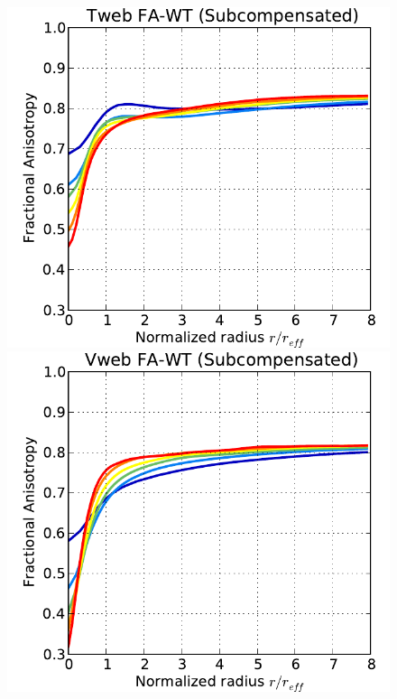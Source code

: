 \documentclass[a4,useAMS,usenatbib,usegraphicx]{mn2e}
\begin{document}
\begin{figure}
\centering  
  \includegraphics[trim = 1mm 0mm 5mm 0mm, clip, keepaspectratio=true,
  width=0.32\textheight]{voids_FA_TwebFAG0.pdf}
  \includegraphics[trim = 1mm 0mm 5mm 0mm, clip, keepaspectratio=true,
  width=0.32\textheight]{voids_FA_VwebFAG0.pdf}

\end{figure}
\end{document}
